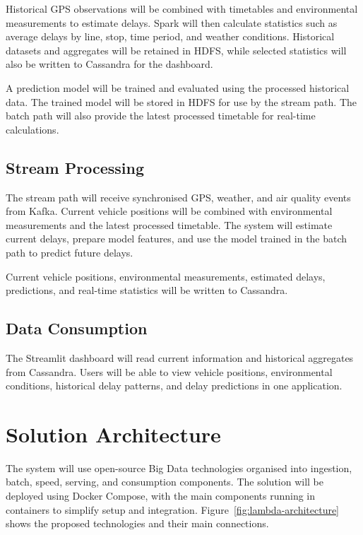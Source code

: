 \documentclass[11pt]{article}
\begin{document}
Historical GPS observations will be combined with timetables and environmental measurements to estimate delays. Spark will then calculate statistics such as average delays by line, stop, time period, and weather conditions. Historical datasets and aggregates will be retained in HDFS, while selected statistics will also be written to Cassandra for the dashboard.

A prediction model will be trained and evaluated using the processed historical data. The trained model will be stored in HDFS for use by the stream path. The batch path will also provide the latest processed timetable for real-time calculations.

\subsection{Stream Processing}

The stream path will receive synchronised GPS, weather, and air quality events from Kafka. Current vehicle positions will be combined with environmental measurements and the latest processed timetable. The system will estimate current delays, prepare model features, and use the model trained in the batch path to predict future delays.

Current vehicle positions, environmental measurements, estimated delays, predictions, and real-time statistics will be written to Cassandra.

\subsection{Data Consumption}

The Streamlit dashboard will read current information and historical aggregates from Cassandra. Users will be able to view vehicle positions, environmental conditions, historical delay patterns, and delay predictions in one application.

\section{Solution Architecture}

The system will use open-source Big Data technologies organised into ingestion, batch, speed, serving, and consumption components. The solution will be deployed using Docker Compose, with the main components running in containers to simplify setup and integration. Figure~\ref{fig:lambda-architecture} shows the proposed technologies and their main connections.
\end{document}
